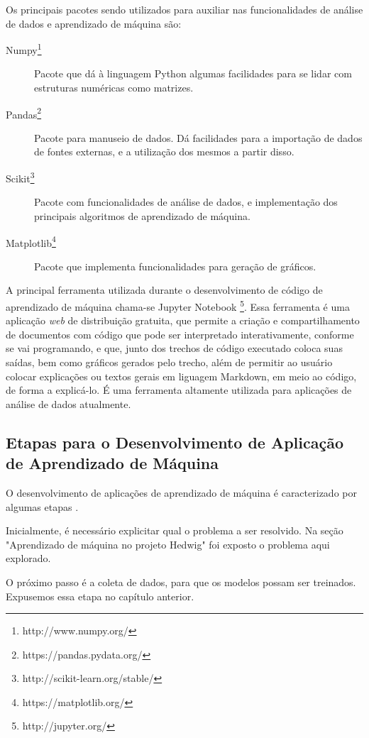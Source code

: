 			Os principais pacotes sendo utilizados para auxiliar nas funcionalidades de análise de dados e aprendizado de máquina são:

			\begin{description}
				\item [Numpy\footnote{http://www.numpy.org/}] Pacote que dá à linguagem Python algumas facilidades para se lidar com estruturas numéricas como matrizes.
				\item [Pandas\footnote{https://pandas.pydata.org/}] Pacote para manuseio de dados. Dá facilidades para a importação de dados de fontes externas, e a utilização dos mesmos a partir disso.
				\item [Scikit\footnote{http://scikit-learn.org/stable/}] Pacote com funcionalidades de análise de dados, e implementação dos principais algoritmos de aprendizado de máquina.
				\item [Matplotlib\footnote{https://matplotlib.org/}] Pacote que implementa funcionalidades para geração de gráficos.
			\end{description}

			A principal ferramenta utilizada durante o desenvolvimento de código de aprendizado de máquina chama-se Jupyter Notebook \footnote{http://jupyter.org/}. Essa ferramenta é uma aplicação \emph{web} de distribuição gratuita, que permite a criação e compartilhamento de documentos com código que pode ser interpretado interativamente, conforme se vai programando, e que, junto dos trechos de código executado coloca suas saídas, bem como gráficos gerados pelo trecho, além de permitir ao usuário colocar explicações ou textos gerais em liguagem Markdown, em meio ao código, de forma a explicá-lo. É uma ferramenta altamente utilizada para aplicações de análise de dados atualmente.

		\subsection{Etapas para o Desenvolvimento de Aplicação de Aprendizado de Máquina}

			O desenvolvimento de aplicações de aprendizado de máquina é caracterizado por algumas etapas \cite{whatIsML}.

			Inicialmente, é necessário explicitar qual o problema a ser resolvido. Na seção "Aprendizado de máquina no projeto Hedwig" foi exposto o problema aqui explorado.

			O próximo passo é a coleta de dados, para que os modelos possam ser treinados. Expusemos essa etapa no capítulo anterior.

